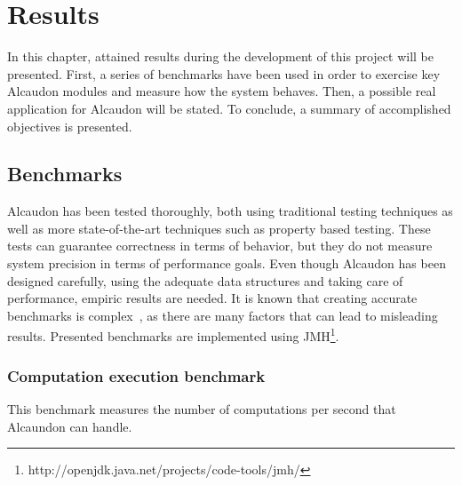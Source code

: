 \chapter{Results}

In this chapter, attained results during the development of this project will be
presented. First, a series of benchmarks have been used in order to exercise key
Alcaudon modules and measure how the system behaves. Then, a possible real
application for Alcaudon will be stated. To conclude, a summary of accomplished
objectives is presented.

\section{Benchmarks}

Alcaudon has been tested thoroughly, both using traditional testing techniques
as well as more state-of-the-art techniques such as property based testing.
These tests can guarantee correctness in terms of behavior, but they do not
measure system precision in terms of performance goals. Even though Alcaudon
has been designed carefully, using the adequate data structures and taking
care of performance, empiric results are needed. It is known that creating
accurate benchmarks is complex~\cite{benchbias}, as there are many factors
that can lead to misleading results. Presented benchmarks are implemented using
JMH\footnote{http://openjdk.java.net/projects/code-tools/jmh/}.

\subsection{Computation execution benchmark}

This benchmark measures the number of computations per second that Alcaundon can
handle.

